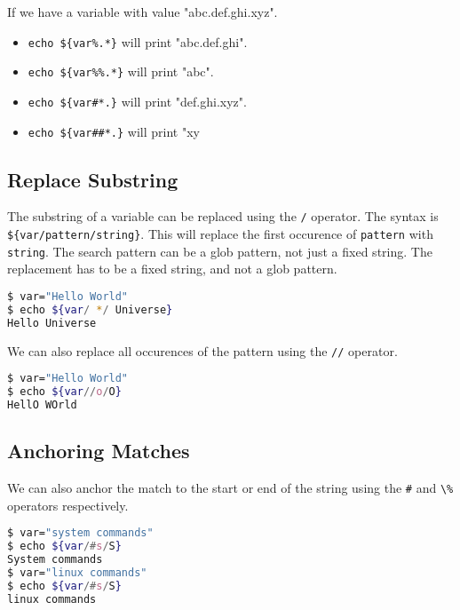 If we have a variable with value "abc.def.ghi.xyz".
\begin{itemize}
  \item \lstinline|echo ${var%.*}| will print "abc.def.ghi".
  \item \lstinline|echo ${var%%.*}| will print "abc".
  \item \lstinline|echo ${var#*.}| will print "def.ghi.xyz".
  \item \lstinline|echo ${var##*.}| will print "xy
\end{itemize}

\subsection{Replace Substring}

The substring of a variable can be replaced using the \lstinline{/} operator.
The syntax is \lstinline|${var/pattern/string}|. This will replace the first occurence of \lstinline{pattern} with \lstinline{string}.
The search pattern can be a glob pattern, not just a fixed string.
The replacement has to be a fixed string, and not a glob pattern.

\begin{lstlisting}[language=bash]
$ var="Hello World"
$ echo ${var/ */ Universe}
Hello Universe
\end{lstlisting}

We can also replace all occurences of the pattern using the \lstinline{//} operator.

\begin{lstlisting}[language=bash]
$ var="Hello World"
$ echo ${var//o/O}
HellO WOrld
\end{lstlisting}

\subsection{Anchoring Matches}

We can also anchor the match to the start or end of the string using the \lstinline{#} and \lstinline{\%} operators respectively.

\begin{lstlisting}[language=bash]
$ var="system commands"
$ echo ${var/#s/S}
System commands
$ var="linux commands"
$ echo ${var/#s/S}
linux commands
\end{lstlisting}

